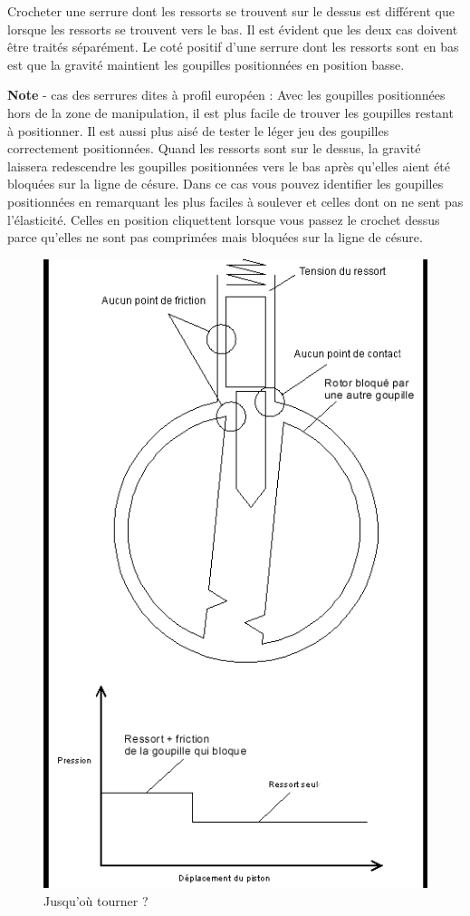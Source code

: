 \documentclass[a4paper,french,11pt,twoside]{report}
\begin{document}
Crocheter une serrure dont les ressorts se trouvent sur le dessus est différent que lorsque les ressorts se trouvent vers le bas. Il est évident que les deux cas doivent être traités séparément. Le coté positif d'une serrure dont les ressorts sont en bas est que la gravité maintient les goupilles positionnées en position basse.

\medskip
\noindent \textbf{Note} - cas des serrures dites à profil européen :
\noindent Avec les goupilles positionnées hors de la zone de manipulation, il est plus facile de trouver les goupilles restant à positionner. Il est aussi plus aisé de tester le léger jeu des goupilles correctement positionnées. Quand les ressorts sont sur le dessus, la gravité laissera redescendre les goupilles positionnées vers le bas après qu'elles aient été bloquées sur la ligne de césure. Dans ce cas vous pouvez identifier les goupilles positionnées en remarquant les plus faciles à soulever et celles dont on ne sent pas l'élasticité. Celles en position cliquettent lorsque vous passez le crochet dessus parce qu'elles ne sont pas comprimées mais bloquées sur la ligne de césure.

\begin{figure}[h] \begin{center}
        \includegraphics[scale=0.5]{images/Image19}
        \caption{Jusqu'où tourner ?}
\end{center} \end{figure}
\end{document}

